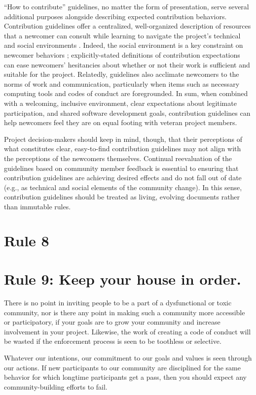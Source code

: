 \documentclass[10pt,letterpaper]{article}
\newcommand{\rulemajor}[1]{\section{#1}}
\begin{document}
``How to contribute'' guidelines,
no matter the form of presentation,
serve several additional purposes alongside describing expected contribution behaviors.
Contribution guidelines offer a centralized, well-organized description of resources
that a newcomer can consult while learning to navigate the project's technical and social environments \cite{b:zanatta2017}.
Indeed, the social environment is a key constraint on newcomer behaviors \cite{b:steinmacher};
explicitly-stated definitions of contribution expectations can ease newcomers' hesitancies
about whether or not their work is sufficient and suitable for the project.
Relatedly,
guidelines also acclimate newcomers to the norms of work and communication,
particularly when items such as necessary computing tools and codes of conduct are foregrounded.
In sum,
when combined with a welcoming, inclusive environment,
clear expectations about legitimate participation,
and shared software development goals,
contribution guidelines can help newcomers feel they are on equal footing with veteran project members.

Project decision-makers should keep in mind,
though,
that their perceptions of what constitutes clear, easy-to-find contribution guidelines
may not align with the perceptions of the newcomers themselves.
Continual reevaluation of the guidelines based on community member feedback is essential
to ensuring that contribution guidelines are achieving desired effects
and do not fall out of date (e.g., as technical and social elements of the community change).
In this sense,
contribution guidelines should be treated as living, evolving documents rather than immutable rules.

\rulemajor{Rule 8}

\rulemajor{Rule 9: Keep your house in order.}

There is no point in inviting people to be a part of a dysfunctional or toxic community,
nor is there any point in making such a community more accessible or participatory,
if your goals are to grow your community and increase involvement in your project.
Likewise,
the work of creating a code of conduct will be wasted
if the enforcement process is seen to be toothless or selective.

Whatever our intentions,
our commitment to our goals and values is seen through our actions.
If new participants to our community are disciplined for the same behavior
for which longtime participants get a pass,
then you should expect any community-building efforts to fail.
\end{document}
